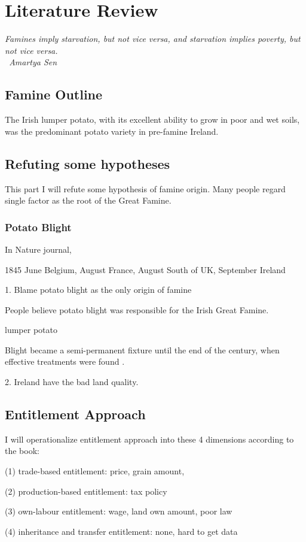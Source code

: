 \chapter{Literature Review}

\vspace{.3cm}

\textit{Famines imply starvation, but not vice versa, and starvation implies poverty, but not vice versa.\\
\textemdash\ Amartya Sen}

\section{Famine Outline}

The Irish lumper potato, with its excellent ability to grow in poor and wet soils, was the predominant potato variety in pre-famine Ireland.

\section{Refuting some hypotheses}

This part I will refute some hypothesis of famine origin. Many people regard single factor as the root of the Great Famine.

\subsection{Potato Blight}

In Nature journal,

1845 June Belgium, August France, August South of UK, September Ireland





1. Blame potato blight as the only origin of famine

People believe potato blight was responsible for the Irish Great Famine. 

lumper potato

Blight became a semi-permanent fixture until the end of the century, when effective treatments were found \citep{o1994economic}.

2. Ireland have the bad land quality.

\section{Entitlement Approach}

I will operationalize entitlement approach into these 4 dimensions according to the book:

(1) trade-based entitlement: price, grain amount, 

(2) production-based entitlement: tax policy

(3) own-labour entitlement: wage, land own amount, poor law

(4) inheritance and transfer entitlement: none, hard to get data



